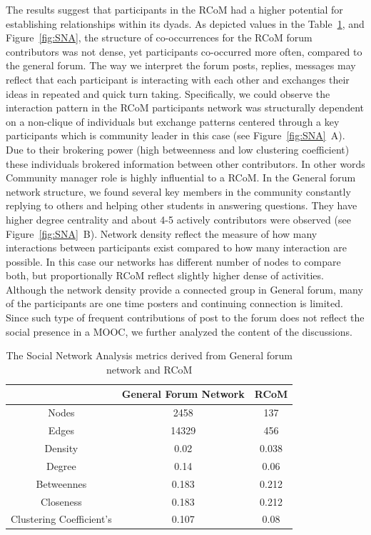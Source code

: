 \documentclass[format=acmsmall, review=false, screen=true]{acmart}
\newcommand{\msb}[1]{{\textcolor{blue}{ [Michael: #1]}}}
\newcommand{\dil}[1]{{\textcolor{magenta}{ Dilrukshi: #1]}}}
\begin{document}
The results suggest that participants in the RCoM had a higher potential for establishing relationships within its dyads. As depicted values in the Table~\ref{tab:SNATab}, and Figure~\ref{fig:SNA}, the structure of co-occurrences for the RCoM forum contributors was not dense, yet participants co-occurred more often, compared to the general forum.  
The way we interpret the forum posts, replies, messages may reflect that each participant is interacting with each other and exchanges their ideas in repeated and quick turn taking. Specifically, we could observe the interaction pattern in the RCoM participants network was structurally dependent on a non-clique of individuals but exchange patterns centered through a key participants which is community leader in this case (see Figure~\ref{fig:SNA}~A). Due to their brokering power (high betweenness and low clustering coefficient) these individuals brokered information between other contributors. In other words Community manager role is highly influential to a RCoM. In the General forum network structure, we found several key members in the community constantly replying to others and helping other students in answering questions. They have higher degree centrality and about 4-5 actively contributors were observed (see Figure~\ref{fig:SNA}~B). Network density reflect the measure of how many interactions between participants exist compared to how many interaction are possible. In this case our networks has different number of nodes to compare both, but proportionally RCoM reflect slightly higher dense of activities. Although the network density provide a connected group in General forum, many of the participants are one time posters and continuing connection is limited. Since such type of frequent contributions of post to the forum does not reflect the social presence in a MOOC, we further analyzed the content of the discussions. 

\begin{table}[h!]
\caption{The Social Network Analysis metrics derived from General forum network and RCoM}
\label{tab:SNATab}
 \begin{tabular}{c|c|c}
 \toprule
 & General Forum Network & RCoM \\
 \midrule
 Nodes	& 2458 & 137 \\
 Edges & 14329 & 456 \\
 Density & 0.02 & 0.038 \\
 Degree & 0.14 & 0.06 \\ 
 Betweennes & 0.183 & 0.212 \\ 
 Closeness & 0.183 & 0.212 \\
 Clustering 
 Coefficient's & 0.107 & 0.08 \\
 \bottomrule
 \end{tabular}
 \end{table}
\end{document}
